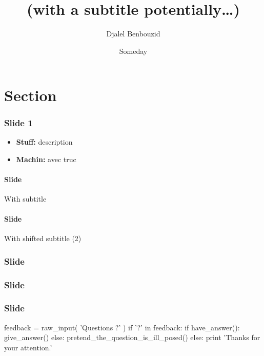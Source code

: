 \documentclass[compress,mathserif,xcolor=dvipsnames,svgnames,aspectratio=169]{beamer}
\begin{document}
\title{\selectfont{The title of the talk}\\\medskip
    \large\textcolor{beautyblue}{
    \textbf{(with a subtitle potentially\ldots)}} \medskip}
\author[{Djalel Benbouzid}]{\textcolor{grizoo}{Djalel Benbouzid}}
\date[someday\ldots]{Someday}%

\begin{frame}
\titlepage
\end{frame}

\section{Section}

\begin{frame}[c]
\frametitle{Slide 1}
\begin{itemize}
    \item \textbf{Stuff:} description 
    \item \textbf{Machin:} avec truc 
\end{itemize}
\end{frame}

\begin{frame}[c]
\framesubtitle{Slide}{With subtitle}
\blindtext
\end{frame}

\begin{frame}[c]
\framesubtitle[1cm]{Slide}{With shifted subtitle (2)}
\blindmathtrue
\blindtext
\end{frame}

\begin{frame}[c]
\frametitle[1cm]{Slide}
\blinditemize
\end{frame}

\begin{frame}[c]
\frametitle[1cm]{Slide}
\blinddescription
\end{frame}

\begin{frame}[c]
\frametitle[1cm]{Slide}
\blindenumerate
\end{frame}



\appendix
{}
\setcounter{finalframe}{\value{framenumber}}

\begin{frame} %
\begin{python}
feedback = raw_input( 'Questions ?' )
if '?' in feedback:
    if have_answer():
        give_answer()
    else:
        pretend_the_question_is_ill_posed()
else:
    print 'Thanks for your attention.'
\end{python}

\end{frame}

%         
%         

\setcounter{framenumber}{\value{finalframe}}
\end{document}
